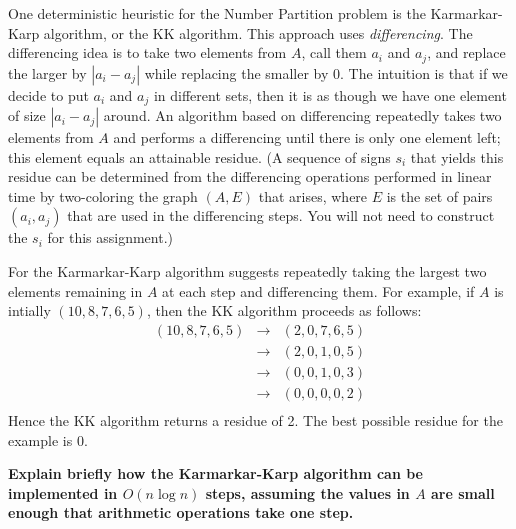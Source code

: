 \documentclass[11pt]{article}
\begin{document}
\smallskip 

One deterministic heuristic for the Number Partition problem is the
Karmarkar-Karp algorithm, or the KK algorithm.  This approach uses
{\em differencing}.  The differencing idea is to take two elements
from $A$, call them $a_i$ and $a_j$, and replace the larger by $|a_i -
a_j|$ while replacing the smaller by 0.  The intuition is that if we
decide to put $a_i$ and $a_j$ in different sets, then it is as though
we have one element of size $|a_i - a_j|$ around.  An algorithm based
on differencing repeatedly takes two elements from $A$ and performs a
differencing until there is only one element left; this element equals
an attainable residue.  (A sequence of signs $s_i$ that yields this
residue can be determined from the differencing operations performed
in linear time by two-coloring the graph $(A,E)$ that arises, where
$E$ is the set of pairs $(a_i,a_j)$ that are used in the differencing
steps.  You will not need to construct the $s_i$ for this assignment.)

For the Karmarkar-Karp algorithm suggests repeatedly taking the
largest two elements remaining in $A$ at each step and differencing
them.  For example, if $A$ is intially $(10,8,7,6,5)$, then the KK
algorithm proceeds as follows:
\begin{eqnarray*}
(10,8,7,6,5) & \rightarrow & (2,0,7,6,5) \\
 & \rightarrow & (2,0,1,0,5) \\
 & \rightarrow & (0,0,1,0,3) \\
 & \rightarrow & (0,0,0,0,2) \\
\end{eqnarray*}
Hence the KK algorithm returns a residue of 2.  The best possible
residue for the example is 0.

\smallskip 
{\bf Explain briefly how the Karmarkar-Karp algorithm can be 
implemented in $O(n \log n)$ steps, assuming the values in 
$A$ are small enough that arithmetic operations take one step.}
\smallskip 

\setlength{\fboxsep}{10pt}
 
\end{document}
